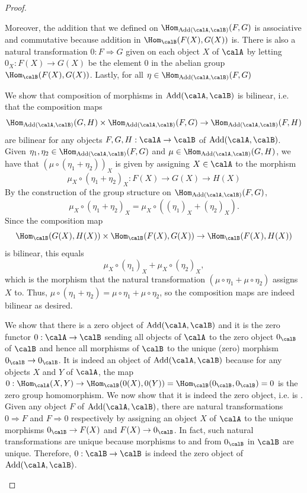 \begin{proof}
\begin{enumerate}
        Moreover, the addition that we defined on $\Hom_{\text{Add}(\calA,\calB)}(F,G)$ is associative and commutative because addition in  $\Hom_\calB(F(X), G(X))$ is. There is also a natural transformation $0: F \Rightarrow G$ given on each object $X$ of $\calA$ by letting $0_X: F(X) \to G(X)$ be the element $0$ in the abelian group $\Hom_{\calB}(F(X),G(X))$. Lastly, for all $\eta \in \Hom_{\text{Add}(\calA,\calB)}(F,G)$
        

        We show that composition of morphisms in $\text{Add}(\calA, \calB)$ is bilinear, i.e. that the composition maps
        $$\Hom_{\text{Add}(\calA, \calB)}(G,H) \times \Hom_{\text{Add}(\calA, \calB)}(F,G) \to \Hom_{\text{Add}(\calA, \calB)}(F,H)$$
        are bilinear for any objects $F,G,H: \calA \to \calB$ of $\text{Add}(\calA, \calB)$. Given $\eta_1,\eta_2 \in \Hom_{\text{Add}(\calA, \calB)}(F,G)$ and $\mu \in \Hom_{\text{Add}(\calA, \calB)}(G,H)$, we have that $(\mu \circ (\eta_1+\eta_2))_X$ is given by assigning $X \in \calA$ to the morphism
        $$\mu_X \circ (\eta_1+\eta_2)_X: F(X) \to G(X) \to H(X)$$
        By the construction of the group structure on $\Hom_{\text{Add}(\calA, \calB)}(F,G)$, 
        $$\mu_X \circ (\eta_1+\eta_2)_X = \mu_X \circ ((\eta_1)_X + (\eta_2)_X).$$
        Since the composition map
        $$\Hom_{\calB}(G(X),H(X)) \times \Hom_{\calB}(F(X),G(X)) \to \Hom_{\calB}(F(X),H(X))$$
        is bilinear, this equals 
        $$\mu_X \circ (\eta_1)_X + \mu_X \circ (\eta_2)_X,$$
        which is the morphism that the natural transformation $(\mu \circ \eta_1 + \mu \circ \eta_2)$ assigns $X$ to. Thus, $\mu \circ (\eta_1 + \eta_2) = \mu \circ \eta_1 + \mu \circ \eta_2$, so the composition maps are indeed bilinear as desired. 

        We show that there is a zero object of $\text{Add}(\calA, \calB)$ and it is the zero functor $0: \calA \to \calB$ sending all objects of $\calA$ to the zero object $0_\calB$ of $\calB$ and hence all morphisms of $\calB$ to the unique (zero) morphism $0_\calB \to 0_\calB$. It is indeed an object of $\text{Add}(\calA, \calB)$ because for any objects $X$ and $Y$ of $\calA$, the map $0: \Hom_\calA(X,Y) \to \Hom_\calB(0(X), 0(Y)) = \Hom_{\calB}(0_\calB, 0_\calB) = 0$ is the zero group homomorphism. We now show that it is indeed the zero object, i.e. is . Given any object $F$ of $\text{Add}(\calA, \calB)$, there are natural transformations $0 \Rightarrow F$ and $F \Rightarrow 0$ respectively by assigning an object $X$ of $\calA$ to the unique morphisms $0_\calB \to F(X)$ and $F(X) \to 0_\calB$. In fact, such natural transformations are unique because morphisms to and from $0_\calB$ in $\calB$ are unique. Therefore, $0: \calB \to \calB$ is indeed the zero object of $\text{Add}(\calA, \calB)$.


\end{enumerate}
\end{proof}
